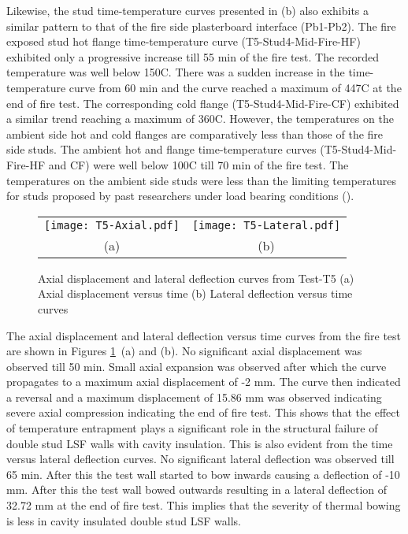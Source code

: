 Likewise, the stud time-temperature curves presented in  (b) also exhibits a similar pattern to that of the fire side plasterboard interface (Pb1-Pb2). The fire exposed stud hot flange time-temperature curve (T5-Stud4-Mid-Fire-HF) exhibited only a progressive increase till 55 min of the fire test. The recorded temperature was well below 150\degree C. There was a sudden increase in the time-temperature curve from 60 min and the curve reached a maximum of 447\degree C at the end of fire test. The corresponding cold flange (T5-Stud4-Mid-Fire-CF) exhibited a similar trend reaching a maximum of 360\degree C. However, the temperatures on the ambient side hot and cold flanges are comparatively less than those of the fire side studs. The ambient hot and flange time-temperature curves (T5-Stud4-Mid-Fire-HF and CF) were well below 100\degree C till 70 min of the fire test. The temperatures on the ambient side studs were less than the limiting temperatures for studs proposed by past researchers under load bearing conditions (\cite{Feng2003,Gunalan2013a}). 
\begin{figure}[!htbp]
	\centering	
		\begin{tabular}{cc}
			\texttt{[image: T5-Axial.pdf]} & \texttt{[image: T5-Lateral.pdf]} \\
			(a) & (b) \\
			\end{tabular}
		\caption{Axial displacement and lateral deflection curves from Test-T5 (a) Axial displacement versus time (b) Lateral deflection versus time curves}
		\label{fig:T5-displacement}
\end{figure}

The axial displacement and lateral deflection versus time curves from the fire test are shown in Figures \ref{fig:T5-displacement}~(a) and (b). No significant axial displacement was observed till 50 min. Small axial expansion was observed after which the curve propagates to a maximum axial displacement of -2 mm. The curve then indicated a reversal and a maximum displacement of 15.86 mm was observed indicating severe axial compression indicating the end of fire test. This shows that the effect of temperature entrapment plays a significant role in the structural failure of double stud LSF walls with cavity insulation. This is also evident from the time versus lateral deflection curves. No significant lateral deflection was observed till 65 min. After this the test wall started to bow inwards causing a deflection of -10 mm. After this the test wall bowed outwards resulting in a lateral deflection of 32.72 mm at the end of fire test. This implies that the severity of thermal bowing is less in cavity insulated double stud LSF walls. 

